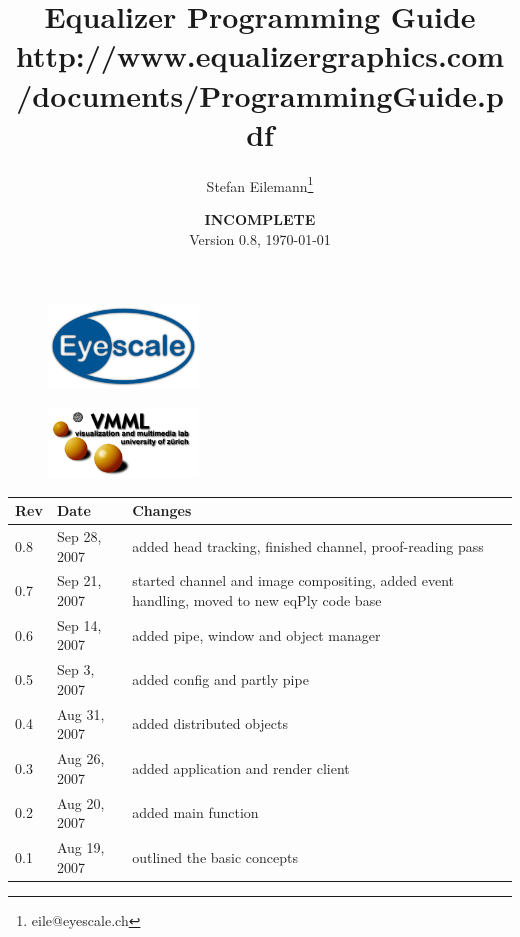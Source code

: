 \documentclass[10pt,a4]{scrartcl}
\title{Equalizer Programming Guide\\
  {\footnotesize\mdseries
    \htmladdnormallink{http://www.equalizergraphics.com/documents/Developer/ProgrammingGuide.pdf}
    {http://www.equalizergraphics.com/documents/ProgrammingGuide.pdf}}
}
\author{Stefan Eilemann\thanks{eile@eyescale.ch}\\[\medskipamount]
}
\date{
  \textbf{INCOMPLETE}\\[\medskipamount]
  Version 0.8, \today
}
\begin{document}
\maketitle
\vfill
\lstset{language=C++}

\thispagestyle{empty}
\begin{figure}[ht]
  \center
  \includegraphics[width=4cm]{images/logo.pdf}
\end{figure}
\vfill
\begin{figure}[ht]
  \center
  \includegraphics[width=4cm]{images/vmml.pdf}
\end{figure}
\vfill



\clearpage
\tableofcontents
\thispagestyle{empty}
\vfill{\center\begin{tabularx}{\textwidth}{|l|l|X|}
    \hline
    \bf Rev & \bf Date     & \bf Changes \\
    \hline
    0.8     & Sep 28, 2007 & added head tracking, finished channel,
                             proof-reading pass\\
    0.7     & Sep 21, 2007 & started channel and image compositing,
                             added event handling, moved to new eqPly
                             code base\\
    0.6     & Sep 14, 2007 & added pipe, window and object manager\\
    0.5     & Sep 3,  2007 & added config and partly pipe\\
    0.4     & Aug 31, 2007 & added distributed objects\\
    0.3     & Aug 26, 2007 & added application and render client\\
    0.2     & Aug 20, 2007 & added main function\\
    0.1     & Aug 19, 2007 & outlined the basic concepts\\
    \hline
  \end{tabularx}}
\thispagestyle{empty}
\clearpage
\end{document}
